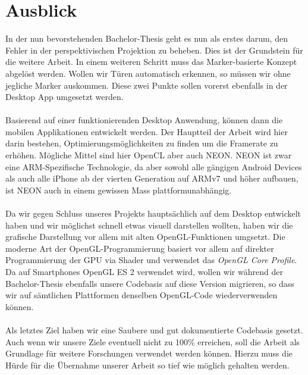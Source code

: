 \documentclass[main.tex]{subfiles}
\begin{document}
\section{Ausblick}

In der nun bevorstehenden Bachelor-Thesis geht es nun als erstes darum, den Fehler in der perspektivischen Projektion zu beheben. Dies ist der Grundstein für die weitere Arbeit. In einem weiteren Schritt muss das Marker-basierte Konzept abgelöst werden. Wollen wir Türen automatisch erkennen, so müssen wir ohne jegliche Marker auskommen. Diese zwei Punkte sollen vorerst ebenfalls in der Desktop App umgesetzt werden.
\paragraph{}
Basierend auf einer funktionierenden Desktop Anwendung, können dann die mobilen Applikationen entwickelt werden. Der Hauptteil der Arbeit wird hier darin bestehen, Optimierungsmöglichkeiten zu finden um die Framerate zu erhöhen. Mögliche Mittel sind hier OpenCL aber auch NEON. NEON ist zwar eine ARM-Spezifische Technologie, da aber sowohl alle gängigen Android Devices als auch alle iPhone ab der vierten Generation auf ARMv7 und höher aufbauen, ist NEON auch in einem gewissen Mass plattformunabhängig.
\paragraph{}
Da wir gegen Schluss unseres Projekts hauptsächlich auf dem Desktop entwickelt haben und wir möglichst schnell etwas visuell darstellen wollten, haben wir die grafische Darstellung vor allem mit alten OpenGL-Funktionen umgsetzt. Die moderne Art der OpenGL-Programmierung basiert vor allem auf direkter Programmierung der GPU via Shader und verwendet das \textit{OpenGL Core Profile}. Da auf Smartphones OpenGL ES 2 verwendet wird, wollen wir während der Bachelor-Thesis ebenfalls unsere Codebasis auf diese Version migrieren, so dass wir auf sämtlichen Plattformen denselben OpenGL-Code wiederverwenden können.
\paragraph{}
Als letztes Ziel haben wir eine Saubere und gut dokumentierte Codebasis gesetzt. Auch wenn wir unsere Ziele eventuell nicht zu 100\% erreichen, soll die Arbeit als Grundlage für weitere Forschungen verwendet werden können. Hierzu muss die Hürde für die Übernahme unserer Arbeit so tief wie möglich gehalten werden.
\end{document}

